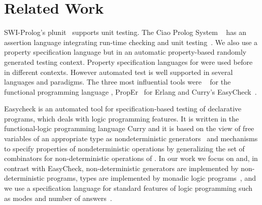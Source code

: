 
\section{Related Work} 
\label{sec:rel-work}


%
{\sf SWI-Prolog}'s {\sf plunit}~\cite{swi-prolog} supports unit testing.
%
The {\sf Ciao Prolog System} ~\cite{ciao-prolog} has an assertion language
integrating run-time checking and unit testing~\cite{ciao-assert-unit}.
%
We also use a property specification language but in an
automatic property-based randomly generated testing context.
%
Property specification languages for \Prolog{} were used
before~\cite{ciao-assert-unit,Deville1990logprog,somogyi1995mercury} in
different contexts.
%
However automated test is well supported in several languages and
paradigms.
%
The three most influential tools were \QuickCheck~\cite{quickcheck} for
the functional programming language \Haskell, {\sf PropEr}~\cite{papadakis2011proper} for %
{\sf Erlang}
and {\sf Curry}'s {\sf EasyCheck}~\cite{christiansen2008easycheck}.


{\sf Easycheck} is an automated tool for specification-based testing of
declarative programs, which deals with logic programming features.
%
It is written in the functional-logic programming language Curry and it
is based on the view of free variables of an appropriate type as
nondeterministic generators~\cite{antoy2006overlapping} and mechanisms
to specify  properties of
nondeterministic operations by generalizing the set of combinators for
non-deterministic operations of \QuickCheck{}.
%
In our work we focus on \Prolog{} and, in contrast with {\sf EasyCheck}, non-deterministic generators are implemented by non-deterministic \Prolog{}
programs, types are implemented by monadic logic programs~\cite{fruhwirth1991logic,florido1992types}, and
we use a specification language for standard features of
logic programming such as modes and number of
answers~\cite{Deville1990logprog}.
%


